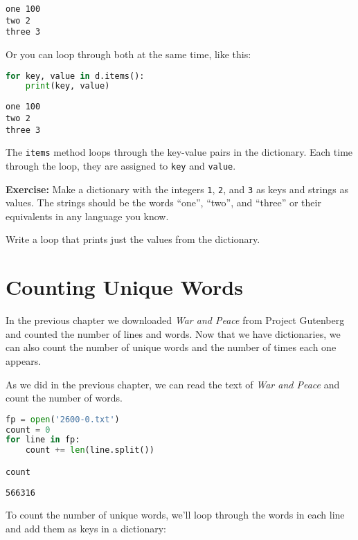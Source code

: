 \begin{lstlisting}[style=output]
one 100
two 2
three 3
\end{lstlisting}

Or you can loop through both at the same time, like this:

\begin{lstlisting}[language=Python,style=source]
for key, value in d.items():
    print(key, value)
\end{lstlisting}

\begin{lstlisting}[style=output]
one 100
two 2
three 3
\end{lstlisting}

The \passthrough{\lstinline!items!} method loops through the key-value
pairs in the dictionary. Each time through the loop, they are assigned
to \passthrough{\lstinline!key!} and \passthrough{\lstinline!value!}.

\textbf{Exercise:} Make a dictionary with the integers
\passthrough{\lstinline!1!}, \passthrough{\lstinline!2!}, and
\passthrough{\lstinline!3!} as keys and strings as values. The strings
should be the words ``one'', ``two'', and ``three'' or their equivalents
in any language you know.

Write a loop that prints just the values from the dictionary.

\section{Counting Unique Words}\label{counting-unique-words}

In the previous chapter we downloaded \emph{War and Peace} from Project
Gutenberg and counted the number of lines and words. Now that we have
dictionaries, we can also count the number of unique words and the
number of times each one appears.

As we did in the previous chapter, we can read the text of \emph{War and
Peace} and count the number of words.

\begin{lstlisting}[language=Python,style=source]
fp = open('2600-0.txt')
count = 0
for line in fp:
    count += len(line.split())

count
\end{lstlisting}

\begin{lstlisting}[style=output]
566316
\end{lstlisting}

To count the number of unique words, we'll loop through the words in
each line and add them as keys in a dictionary:

